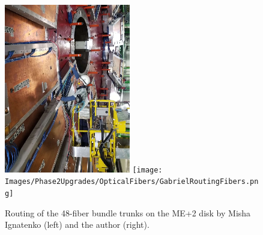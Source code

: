\begin{figure}[H]
    \centering
    {\includegraphics[width=0.49\textwidth]{Images/Phase2Upgrades/OpticalFibers/MishaRoutingFibers.jpeg}}
    {\texttt{[image: Images/Phase2Upgrades/OpticalFibers/GabrielRoutingFibers.png]}}
    \caption{Routing of the 48-fiber bundle trunks on the ME+2 disk by Misha Ignatenko (left) and the author (right).}
    \label{fig:MishaGabrielRoutingFibers}
\end{figure}